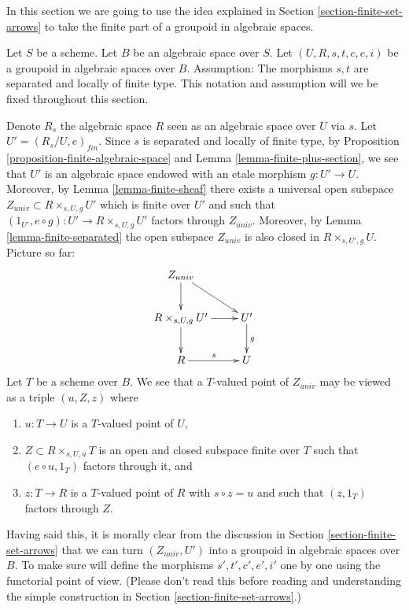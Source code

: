 \noindent
In this section we are going to use the idea explained in
Section \ref{section-finite-set-arrows}
to take the finite part of a groupoid in algebraic spaces.

\medskip\noindent
Let $S$ be a scheme.
Let $B$ be an algebraic space over $S$.
Let $(U, R, s, t, c, e, i)$ be a groupoid in algebraic spaces over $B$.
Assumption: The morphisms $s, t$ are separated and locally of finite type.
This notation and assumption will we be fixed throughout this section.

\medskip\noindent
Denote $R_s$ the algebraic space $R$ seen as an
algebraic space over $U$ via $s$. Let
$U' = (R_s/U, e)_{fin}$. Since $s$ is separated and locally of
finite type, by
Proposition \ref{proposition-finite-algebraic-space} and
Lemma \ref{lemma-finite-plus-section},
we see that $U'$ is an algebraic space endowed with an etale morphism
$g : U' \to U$. Moreover, by
Lemma \ref{lemma-finite-sheaf}
there exists a universal open subspace
$Z_{univ} \subset R \times_{s, U, g} U'$ which is finite over $U'$
and such that $(1_{U'}, e \circ g) : U' \to R \times_{s, U, g} U'$
factors through $Z_{univ}$. Moreover, by
Lemma \ref{lemma-finite-separated}
the open subspace $Z_{univ}$ is also closed in $R \times_{s, U', g} U$.
Picture so far:
$$
\xymatrix{
Z_{univ} \ar[d] \ar[rd] & \\
R \times_{s, U, g} U' \ar[d] \ar[r] & U' \ar[d]^g \\
R \ar[r]^s & U
}
$$
Let $T$ be a scheme over $B$. We see that a $T$-valued point of
$Z_{univ}$ may be viewed as a triple $(u, Z, z)$ where
\begin{enumerate}
\item $u : T \to U$ is a $T$-valued point of $U$,
\item $Z \subset R \times_{s, U, u} T$ is an open and closed subspace
finite over $T$ such that $(e \circ u, 1_T)$ factors through it, and
\item $z : T \to R$ is a $T$-valued point of $R$ with $s \circ z = u$
and such that $(z, 1_T)$ factors through $Z$.
\end{enumerate}
Having said this, it is morally clear from the discussion in
Section \ref{section-finite-set-arrows}
that we can turn $(Z_{univ}, U')$ into a groupoid in algebraic spaces
over $B$. To make sure will define the morphisms $s', t', c', e', i'$
one by one using the functorial point of view. (Please don't read this
before reading and understanding the simple construction in
Section \ref{section-finite-set-arrows}.)

